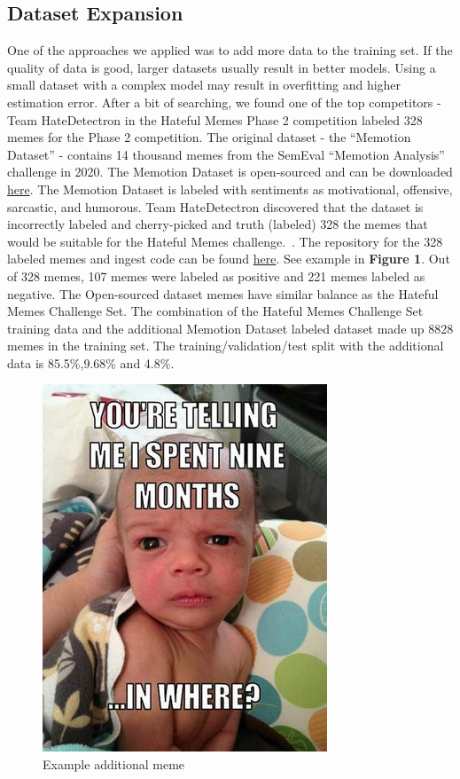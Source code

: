 \documentclass[10pt,twocolumn,letterpaper]{article}
\begin{document}
\subsection{Dataset Expansion}
One of the approaches we applied was to add more data to the training set. If the quality of data is good, larger datasets usually result in better models. Using a small dataset with a complex model may result in overfitting and higher estimation error. After a bit of searching, we found one of the top competitors - Team HateDetectron in the Hateful Memes Phase 2 competition labeled 328 memes for the Phase 2 competition. The original dataset - the “Memotion Dataset” - contains 14 thousand memes from the SemEval “Memotion Analysis” challenge in 2020. The Memotion Dataset is open-sourced and can be downloaded \href{https://www.kaggle.com/williamscott701/memotion-dataset-7k}{here}. The Memotion Dataset is labeled with sentiments as motivational, offensive, sarcastic, and humorous. Team HateDetectron discovered that the dataset is incorrectly labeled and cherry-picked and truth (labeled) 328 the memes that would be suitable for the Hateful Memes challenge.~\cite{Authors3}. The repository for the 328 labeled memes and ingest code can be found \href{https://github.com/rizavelioglu/hateful_memes-hate_detectron}{here}. See example in \textbf{Figure 1}. Out of 328 memes, 107 memes were labeled as positive and 221 memes labeled as negative. The Open-sourced dataset memes have similar balance as the Hateful Memes Challenge Set. The combination of the Hateful Memes Challenge Set training data and the additional Memotion Dataset labeled dataset made up 8828 memes in the training set. The training/validation/test split with the additional data is 85.5\%,9.68\% and 4.8\%.

\begin{figure}[ht!]
\centering
\includegraphics[scale=0.5]{images/new_meme.png}
\caption{Example additional meme}
\end{figure}
\end{document}
